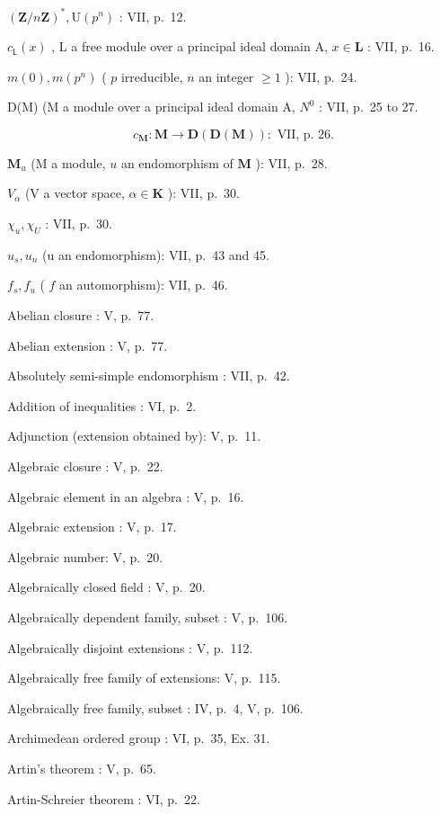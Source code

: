 \((\mathbf{Z} / n\mathbf{Z})^{*}, \mathrm{U}(p^{n})\) : VII, p.~12.

\(c_{\mathsf{L}}(x)\) , L a free module over a principal ideal domain A, \(x\in \mathbf{L}\) : VII, p.~16.

\(m(0), m(p^n)\) ( \(p\) irreducible, \(n\) an integer \(\geqslant 1\) ): VII, p.~24.

D(M) (M a module over a principal ideal domain A, \(N^{0}\) : VII, p.~25 to 27.

\[
c _ {\mathbf {M}}: \mathbf {M} \rightarrow \mathbf {D} (\mathbf {D} (\mathbf {M})): \text { VII,   p. } 26.
\]

\(\mathbf{M}_u\) (M a module, \(u\) an endomorphism of \(\mathbf{M}\) ): VII, p.~28.

\(V_{\alpha}\) (V a vector space, \(\alpha \in \mathbf{K}\) ): VII, p.~30.

\(\chi_{u}, \chi_{U}\) : VII, p.~30.

\(u_{s}, u_{n}\) (u an endomorphism): VII, p.~43 and 45.

\(f_{s}, f_{u}\) ( \(f\) an automorphism): VII, p.~46.


Abelian closure : V, p.~77.

Abelian extension : V, p.~77.

Absolutely semi-simple endomorphism : VII, p.~42.

Addition of inequalities : VI, p.~2.

Adjunction (extension obtained by): V, p.~11.

Algebraic closure : V, p.~22.

Algebraic element in an algebra : V, p.~16.

Algebraic extension : V, p.~17.

Algebraic number: V, p.~20.

Algebraically closed field : V, p.~20.

Algebraically dependent family, subset : V, p.~106.

Algebraically disjoint extensions : V, p.~112.

Algebraically free family of extensions: V, p.~115.

Algebraically free family, subset : IV, p.~4, V, p.~106.

Archimedean ordered group : VI, p.~35, Ex. 31.

Artin's theorem : V, p.~65.

Artin-Schreier theorem : VI, p.~22.

